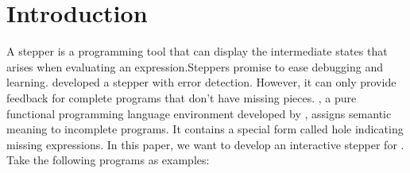 \section{Introduction}
\label{sec:intro}

A stepper is a programming tool that can display the intermediate states that arises when evaluating an expression.Steppers promise to ease debugging and learning. \citet{findler_drscheme_2002} developed a stepper with error detection. However, it can only provide feedback for complete programs that don't have missing pieces. \Hazel, a pure functional programming language environment developed by \citet{HazelnutPOPL}, assigns semantic meaning to incomplete programs. It contains a special form called hole indicating missing expressions. In this paper, we want to develop an interactive stepper for \Hazel. Take the following programs as examples:

